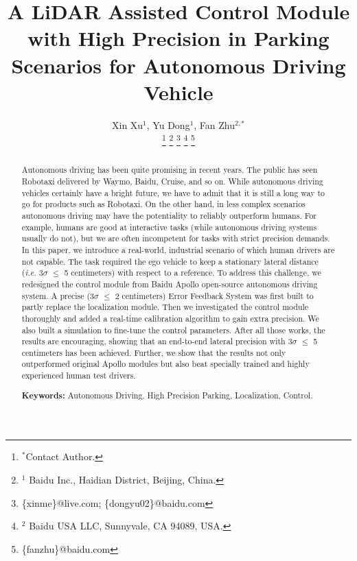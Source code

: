 \documentclass[letterpaper, 10 pt, conference]{ieeeconf}
\title{
A LiDAR Assisted Control Module with High Precision in Parking Scenarios for Autonomous Driving Vehicle
}
\author{
	Xin Xu$^{1}$,
	Yu Dong$^{1}$,
	Fan Zhu$^{2, *}$ \\
    \thanks{$^{*}$Contact Author.}
    \thanks{$^1$ Baidu Inc., Haidian District, Beijing, China.}
    \thanks {\{xinme\}@live.com; \{dongyu02\}@baidu.com}
    \thanks{$^2$ Baidu USA LLC, Sunnyvale, CA 94089, USA.}
    \thanks{\{fanzhu\}@baidu.com}
}
\begin{document}
\maketitle
\thispagestyle{empty}
\pagestyle{empty}
\begin{abstract}
Autonomous driving has been quite promising in recent years. The public has seen Robotaxi delivered by Waymo, Baidu, Cruise, and so on. While autonomous driving vehicles certainly have a bright future, we have to admit that it is still a long way to go for products such as Robotaxi. 
On the other hand, in less complex scenarios autonomous driving may have the potentiality to reliably outperform humans. For example, humans are good at interactive tasks (while autonomous driving systems usually do not), but we are often incompetent for tasks with strict precision demands. 
In this paper, we introduce a real-world, industrial scenario of which human drivers are not capable. The task required the ego vehicle to keep a stationary lateral distance (\textit{i.e.} 3$\sigma$ $\leq$ 5 centimeters) with respect to a reference. To address this challenge, we redesigned the control module from Baidu Apollo open-source autonomous driving system. 
A precise (3$\sigma$ $\leq$ 2 centimeters) Error Feedback System was first built to partly replace the localization module. Then we investigated the control module thoroughly and added a real-time calibration algorithm to gain extra precision. We also built a simulation to fine-tune the control parameters. 
After all those works, the results are encouraging, showing that an end-to-end lateral precision with 3$\sigma$ $\leq$ 5 centimeters has been achieved. Further, we show that the results not only outperformed original Apollo modules but also beat specially trained and highly experienced human test drivers.

\textbf{Keywords:} Autonomous Driving, High Precision Parking, Localization, Control.
\end{abstract}

\end{document}

